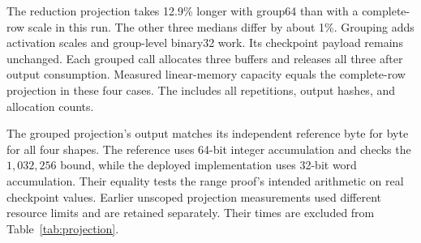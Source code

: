 The reduction projection takes 12.9\% longer with group64 than with a complete-row scale in this run.  The other three medians differ by about 1\%.  Grouping adds activation scales and group-level binary32 work.  Its checkpoint payload remains unchanged.  Each grouped call allocates three buffers and releases all three after output consumption.  Measured linear-memory capacity equals the complete-row projection in these four cases.  The  includes all repetitions, output hashes, and allocation counts.

The grouped projection's output matches its independent reference byte for byte for all four shapes.  The reference uses 64-bit integer accumulation and checks the $1{,}032{,}256$ bound, while the deployed implementation uses 32-bit word accumulation.  Their equality tests the range proof's intended arithmetic on real checkpoint values.  Earlier unscoped projection measurements used different resource limits and are retained separately.  Their times are excluded from Table~\ref{tab:projection}.

